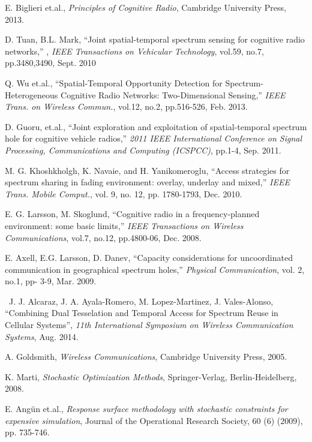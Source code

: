 \begin{thebibliography}{1}
 E. Biglieri et.al., \emph{Principles of Cognitive Radio}, Cambridge University Press, 2013.

 D. Tuan, B.L. Mark, ``Joint spatial-temporal spectrum sensing for cognitive radio networks,'' , \emph{IEEE Transactions on Vehicular Technology}, vol.59, no.7, pp.3480,3490, Sept. 2010

 Q. Wu et.al., ``Spatial-Temporal Opportunity Detection for Spectrum-Heterogeneous Cognitive Radio Networks: Two-Dimensional Sensing,'' \emph{IEEE Trans. on Wireless Commun.}, vol.12, no.2, pp.516-526, Feb. 2013.

 D. Guoru, et.al., ``Joint exploration and exploitation of spatial-temporal spectrum hole for cognitive vehicle radios,'' \emph{2011 IEEE International Conference on Signal Processing, Communications and Computing (ICSPCC)}, pp.1-4, Sep. 2011.

  M. G. Khoshkholgh, K. Navaie, and H. Yanikomeroglu, ``Access strategies for spectrum sharing in fading environment: overlay, underlay and mixed,'' \emph{IEEE Trans. Mobile Comput.}, vol. 9, no. 12, pp. 1780-1793, Dec. 2010.

 E. G. Larsson, M. Skoglund, ``Cognitive radio in a frequency-planned environment: some basic limits,'' \emph{IEEE Transactions on Wireless Communications}, vol.7, no.12, pp.4800-06, Dec. 2008.

 E. Axell, E.G. Larsson, D. Danev, ``Capacity considerations for uncoordinated communication in geographical spectrum holes,'' \emph{Physical Communication}, vol. 2, no.1, pp- 3-9, Mar. 2009.

 J. J. Alcaraz, J. A. Ayala-Romero, M. Lopez-Martinez, J. Vales-Alonso, ``Combining Dual Tesselation and Temporal Access for Spectrum Reuse in Cellular Systems'', \emph{11th International Symposium on Wireless Communication Systems}, Aug. 2014.

 A. Goldsmith, \emph{Wireless Communications}, Cambridge University Press, 2005.

 K. Marti, \emph{Stochastic Optimization Methods}, Springer-Verlag, Berlin-Heidelberg, 2008.

 E. Angün et.al., \emph{Response surface methodology with stochastic constraints for expensive simulation}, Journal of the Operational Research Society, 60 (6) (2009), pp. 735-746.


\end{thebibliography}
